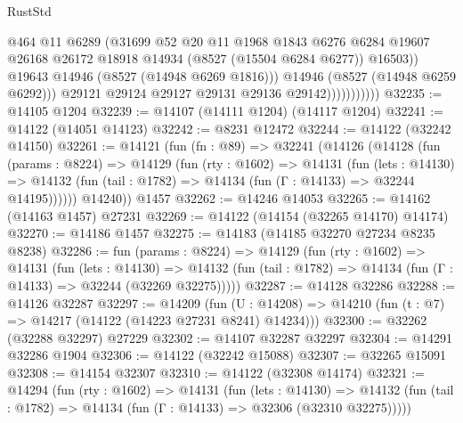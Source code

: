 \begin{lexlean}{RustStd}
\begin{coremodule}
                                @464
                                @11
                                @6289
                                (@31699
                                  @52
                                  @20
                                  @11
                                  @1968
                                  @1843
                                  @6276
                                  @6284
                                  @19607
                                  @26168
                                  @26172
                                  @18918
                                  @14934
                                  (@8527 (@15504 @6284 @6277))
                                  @16503))
                              @19643
                              @14946
                              (@8527 (@14948 @6269 @1816)))
                            @14946
                            (@8527 (@14948 @6259 @6292)))
                          @29121
                          @29124
                          @29127
                          @29131
                          @29136
                          @29142)))))))))))
@32235 := @14105 @1204
@32239 := @14107 (@14111 @1204) (@14117 @1204)
@32241 := @14122 (@14051 @14123)
@32242 := @8231 @12472
@32244 := @14122 (@32242 @14150)
@32261 := @14121
    (fun (fn : @89) =>
    @32241
      (@14126
        (@14128
          (fun (params : @8224) =>
          @14129
            (fun (rty : @1602) =>
            @14131
              (fun (lets : @14130) =>
              @14132 (fun (tail : @1782) => @14134 (fun (Γ : @14133) => @32244 @14195))))))
        @14240))
    @1457
@32262 := @14246 @14053
@32265 := @14162 (@14163 @1457) @27231
@32269 := @14122 (@14154 (@32265 @14170) @14174)
@32270 := @14186 @1457
@32275 := @14183 (@14185 @32270 @27234 @8235 @8238)
@32286 := fun (params : @8224) =>
  @14129
    (fun (rty : @1602) =>
    @14131
      (fun (lets : @14130) =>
      @14132 (fun (tail : @1782) => @14134 (fun (Γ : @14133) => @32244 (@32269 @32275)))))
@32287 := @14128 @32286
@32288 := @14126 @32287
@32297 := @14209
    (fun (U : @14208) => @14210 (fun (t : @7) => @14217 (@14122 (@14223 @27231 @8241) @14234)))
@32300 := @32262 (@32288 @32297) @27229
@32302 := @14107 @32287 @32297
@32304 := @14291 @32286 @1904
@32306 := @14122 (@32242 @15088)
@32307 := @32265 @15091
@32308 := @14154 @32307
@32310 := @14122 (@32308 @14174)
@32321 := @14294
    (fun (rty : @1602) =>
    @14131
      (fun (lets : @14130) =>
      @14132 (fun (tail : @1782) => @14134 (fun (Γ : @14133) => @32306 (@32310 @32275)))))

\end{coremodule}
\end{lexlean}

